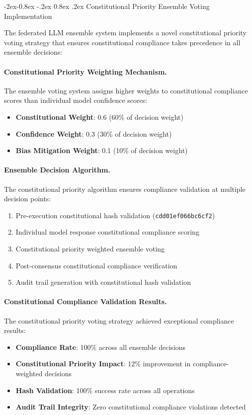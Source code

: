 \documentclass[manuscript,screen,9pt]{acmart}
\makeatletter
\renewcommand\subsubsection{\@startsection{subsubsection}{3}{\z@}%
  {-2ex\@plus -0.8ex \@minus -.2ex}%
  {0.8ex \@plus .2ex}%
  {\normalfont\normalsize\bfseries}}
\makeatother
\begin{document}
\subsubsection{Constitutional Priority Ensemble Voting Implementation}
\label{subsubsec:constitutional_priority_voting}

The federated LLM ensemble system implements a novel constitutional priority voting strategy that ensures constitutional compliance takes precedence in all ensemble decisions:

\paragraph{Constitutional Priority Weighting Mechanism.} The ensemble voting system assigns higher weights to constitutional compliance scores than individual model confidence scores:
\begin{itemize}[itemsep=1pt,parsep=1pt]
    \item \textbf{Constitutional Weight}: 0.6 (60\% of decision weight)
    \item \textbf{Confidence Weight}: 0.3 (30\% of decision weight)
    \item \textbf{Bias Mitigation Weight}: 0.1 (10\% of decision weight)
\end{itemize}

\paragraph{Ensemble Decision Algorithm.} The constitutional priority algorithm ensures compliance validation at multiple decision points:
\begin{enumerate}[itemsep=1pt,parsep=1pt]
    \item Pre-execution constitutional hash validation (\texttt{cdd01ef066bc6cf2})
    \item Individual model response constitutional compliance scoring
    \item Constitutional priority weighted ensemble voting
    \item Post-consensus constitutional compliance verification
    \item Audit trail generation with constitutional hash validation
\end{enumerate}

\paragraph{Constitutional Compliance Validation Results.} The constitutional priority voting strategy achieved exceptional compliance results:
\begin{itemize}[itemsep=1pt,parsep=1pt]
    \item \textbf{Compliance Rate}: 100\% across all ensemble decisions
    \item \textbf{Constitutional Priority Impact}: 12\% improvement in compliance-weighted decisions
    \item \textbf{Hash Validation}: 100\% success rate across all operations
    \item \textbf{Audit Trail Integrity}: Zero constitutional compliance violations detected
\end{itemize}
\end{document}
